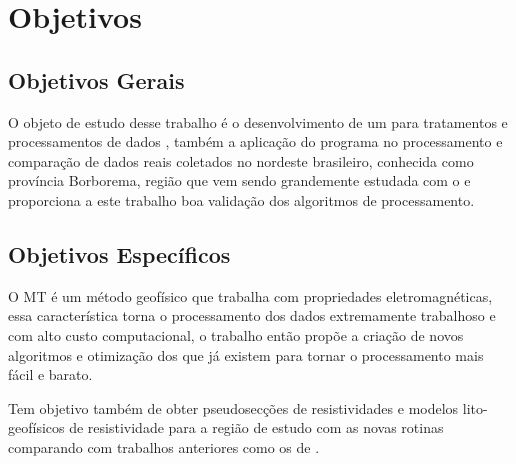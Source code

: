 
\chapter{Objetivos}
\label{cap-objetivos}

\section{Objetivos Gerais}
\label{cap-objetivos gerais}

    
    O objeto de estudo desse trabalho é o desenvolvimento de um  para tratamentos e processamentos de dados \MT, também a aplicação do programa no processamento e comparação de dados reais coletados no nordeste brasileiro, conhecida como província Borborema, região que vem sendo grandemente estudada com o \MT e proporciona a este trabalho boa validação dos algoritmos de processamento.   

\section{Objetivos Específicos}
\label{cap-objetivos especificos}

    O MT é um método geofísico que trabalha com propriedades eletromagnéticas, essa característica torna o processamento dos dados extremamente trabalhoso e com alto custo computacional, o trabalho então propõe a criação de novos algoritmos e otimização dos que já existem para tornar o processamento mais fácil e barato.
    
    Tem objetivo também de obter pseudosecções de resistividades e modelos lito-geofísicos de resistividade para a região de estudo com as novas rotinas comparando com trabalhos anteriores como os de .
